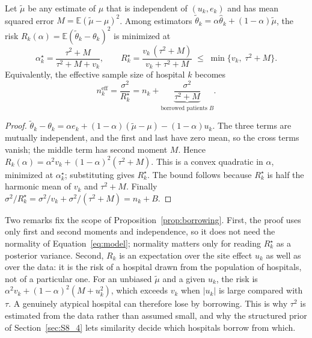 \documentclass[acmsmall,screen,review]{acmart}
\newcommand{\eff}{\mathrm{eff}}
\theoremstyle{acmdefinition}
\begin{document}
\begin{proposition}\label{prop:borrowing}
Let $\tilde{\mu}$ be any estimate of $\mu$ that is independent of $(u_k,e_k)$ and has mean squared error $M=\mathbb{E}(\tilde{\mu}-\mu)^2$. Among estimators $\tilde{\theta}_k=\alpha\hat{\theta}_k+(1-\alpha)\tilde{\mu}$, the risk $R_k(\alpha)=\mathbb{E}(\tilde{\theta}_k-\theta_k)^2$ is minimized at
\[
\alpha_k^{\star}=\frac{\tau^2+M}{\tau^2+M+v_k},\qquad R_k^{\star}=\frac{v_k\,(\tau^2+M)}{v_k+\tau^2+M}\;\le\;\min\{v_k,\;\tau^2+M\}.
\]
Equivalently, the effective sample size of hospital $k$ becomes
\begin{equation}\label{eq:borrowed}
n_k^{\eff}=\frac{\sigma^2}{R_k^{\star}}=n_k+\underbrace{\frac{\sigma^2}{\tau^2+M}}_{\text{borrowed patients }B}.
\end{equation}
\end{proposition}
\begin{proof}
$\tilde{\theta}_k-\theta_k=\alpha e_k+(1-\alpha)(\tilde{\mu}-\mu)-(1-\alpha)u_k$. The three terms are mutually independent, and the first and last have zero mean, so the cross terms vanish; the middle term has second moment $M$. Hence $R_k(\alpha)=\alpha^2 v_k+(1-\alpha)^2(\tau^2+M)$. This is a convex quadratic in $\alpha$, minimized at $\alpha_k^{\star}$; substituting gives $R_k^{\star}$. The bound follows because $R_k^{\star}$ is half the harmonic mean of $v_k$ and $\tau^2+M$. Finally $\sigma^2/R_k^{\star}=\sigma^2/v_k+\sigma^2/(\tau^2+M)=n_k+B$.
\end{proof}

Two remarks fix the scope of Proposition~\ref{prop:borrowing}. First, the proof uses only first and second moments and independence, so it does not need the normality of Equation~\eqref{eq:model}; normality matters only for reading $R_k^{\star}$ as a posterior variance. Second, $R_k$ is an expectation over the site effect $u_k$ as well as over the data: it is the risk of a hospital drawn from the population of hospitals, not of a particular one. For an unbiased $\tilde{\mu}$ and a given $u_k$, the risk is $\alpha^2 v_k+(1-\alpha)^2(M+u_k^2)$, which exceeds $v_k$ when $|u_k|$ is large compared with $\tau$. A genuinely atypical hospital can therefore lose by borrowing. This is why $\tau^2$ is estimated from the data rather than assumed small, and why the structured prior of Section~\ref{sec:S8_4} lets similarity decide which hospitals borrow from which.
\end{document}
